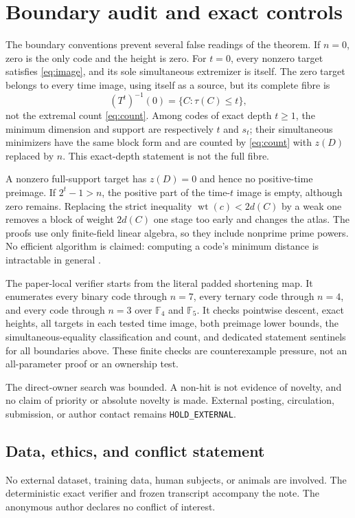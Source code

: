 \documentclass[a4paper,10pt]{amsart}
\theoremstyle{remark}
\newcommand{\F}{\mathbb F}
\newcommand{\wt}{\operatorname{wt}}
\begin{document}
\section{Boundary audit and exact controls}

The boundary conventions prevent several false readings of the theorem.
If $n=0$, zero is the only code and the height is zero.  For $t=0$, every
nonzero target satisfies \eqref{eq:image}, and its sole simultaneous
extremizer is itself.  The zero target belongs to every time image, using
itself as a source, but its complete fibre is
\[
 (T^t)^{-1}(0)=\{C:\tau(C)\leq t\},
\]
not the extremal count \eqref{eq:count}.  Among codes of exact depth
$t\geq1$, the minimum dimension and support are respectively $t$ and
$s_t$; their simultaneous minimizers have the same block form and are
counted by \eqref{eq:count} with $z(D)$ replaced by $n$.  This exact-depth
statement is not the full fibre.

A nonzero full-support target has $z(D)=0$ and hence no positive-time
preimage.  If $2^t-1>n$, the positive part of the time-$t$ image is empty,
although zero remains.  Replacing the strict inequality
$\wt(c)<2d(C)$ by a weak one removes a block of weight $2d(C)$ one stage
too early and changes the atlas.  The proofs use only finite-field linear
algebra, so they include nonprime prime powers.  No efficient algorithm is
claimed: computing a code's minimum distance is intractable in general
\cite{Vardy1997}.

The paper-local verifier starts from the literal padded shortening map.  It
enumerates every binary code through $n=7$, every ternary code through
$n=4$, and every code through $n=3$ over $\F_4$ and $\F_5$.  It checks
pointwise descent, exact heights, all targets in each tested time image,
both preimage lower bounds, the simultaneous-equality classification and
count, and dedicated statement sentinels for all boundaries above.  These
finite checks are counterexample pressure, not an all-parameter proof or an
ownership test.

The direct-owner search was bounded.  A non-hit is not evidence of novelty,
and no claim of priority or absolute novelty is made.  External posting,
circulation, submission, or author contact remains
\texttt{HOLD\_EXTERNAL}.

\subsection*{Data, ethics, and conflict statement}
No external dataset, training data, human subjects, or animals are involved.
The deterministic exact verifier and frozen transcript accompany the note.
The anonymous author declares no conflict of interest.



\end{document}

